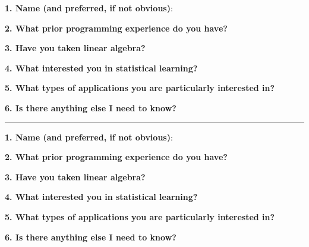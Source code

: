 \documentclass[12pt]{article}
\begin{document}
\textbf{1. Name (and preferred, if not obvious)}:

\vspace{1cm}

\textbf{2. What prior programming experience do you have?}

\vspace{2cm}

\textbf{3. Have you taken linear algebra?}

\vspace{1cm}

\textbf{4. What interested you in statistical learning?}

\vspace{2cm}

\textbf{5. What types of applications you are particularly interested in?}

\vspace{2cm}

\textbf{6. Is there anything else I need to know?}

\vspace{1cm}

\noindent\rule{19cm}{3pt}

\vspace{1cm}

\textbf{1. Name (and preferred, if not obvious)}:

\vspace{1cm}

\textbf{2. What prior programming experience do you have?}

\vspace{2cm}

\textbf{3. Have you taken linear algebra?}

\vspace{1cm}

\textbf{4. What interested you in statistical learning?}

\vspace{2cm}

\textbf{5. What types of applications you are particularly interested in?}

\vspace{2cm}

\textbf{6. Is there anything else I need to know?}

\vspace{2cm}
\end{document}
